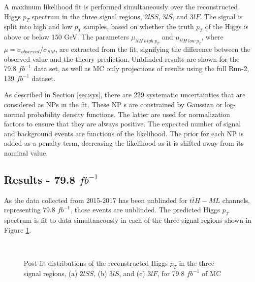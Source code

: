 A maximum likelihood fit is performed simultaneously over the reconstructed Higgs $p_T$ spectrum in the three signal regions, $2lSS$, $3lS$, and $3lF$. The signal is split into high and low $p_T$ samples, based on whether the truth $p_T$ of the Higgs is above or below 150 GeV. The parameters $\mu_{t\bar{t}H\ high\ p_T}$ and $\mu_{t\bar{t}H\ low\ p_T}$, where $\mu = \sigma_{observed}/\sigma_{SM} $, are extracted from the fit, signifying the difference between the observed value and the theory prediction. Unblinded results are shown for the 79.8 $fb^{-1}$ data set, as well as MC only projections of results using the full Run-2, 139 $fb^{-1}$ dataset.

As described in Section \ref{sec:sys}, there are 229 systematic uncertainties that are considered as NPs in the fit. These NP s are constrained by Gaussian or log-normal probability density functions. The latter are used for normalization factors to ensure that they are always positive. The expected number of signal and background events are functions of the likelihood. The prior for each NP is added as a penalty term, decreasing the likelihood as it is shifted away from its nominal value.

\subsection{Results - 79.8 $fb^{-1}$}
\label{sec:res80}

As the data collected from 2015-2017 has been unblinded for $t\bar{t}H-ML$ channels, representing 79.8 $fb^{-1}$, those events are unblinded. The predicted Higgs $p_T$ spectrum is fit to data simultaneously in each of the three signal regions shown in Figure \ref{fig:sigRegions80}.

\begin{figure}[H]
    \centering
    \\
    \caption{Post-fit distributions of the reconstructed Higgs $p_T$ in the three signal regions, (a) $2lSS$, (b) $3lS$, and (c) $3lF$, for 79.8 $fb^{-1}$ of MC}
    \label{fig:sigRegions80}
\end{figure}

